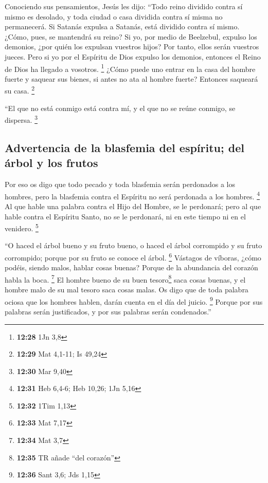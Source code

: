 \begin{paracol}{2}
 Conociendo sus pensamientos, Jesús les dijo: ``Todo
reino dividido contra sí mismo es desolado, y toda ciudad o casa
dividida contra sí misma no permanecerá.  Si Satanás
expulsa a Satanás, está dividido contra sí mismo. ¿Cómo, pues, se
mantendrá su reino?  Si yo, por medio de Beelzebul,
expulso los demonios, ¿por quién los expulsan vuestros hijos? Por tanto,
ellos serán vuestros jueces.  Pero si yo por el Espíritu
de Dios expulso los demonios, entonces el Reino de Dios ha llegado a
vosotros. \footnote{\textbf{12:28} 1Jn 3,8}  ¿Cómo puede
uno entrar en la casa del hombre fuerte y saquear sus bienes, si antes
no ata al hombre fuerte? Entonces saqueará su casa. \footnote{\textbf{12:29}
  Mat 4,1-11; Is 49,24}

 ``El que no está conmigo está contra mí, y el que no se
reúne conmigo, se dispersa. \footnote{\textbf{12:30} Mar 9,40}

\hypertarget{advertencia-de-la-blasfemia-del-espuxedritu-del-uxe1rbol-y-los-frutos}{%
\subsection{Advertencia de la blasfemia del espíritu; del árbol y los
frutos}\label{advertencia-de-la-blasfemia-del-espuxedritu-del-uxe1rbol-y-los-frutos}}

 Por eso os digo que todo pecado y toda blasfemia serán
perdonados a los hombres, pero la blasfemia contra el Espíritu no será
perdonada a los hombres. \footnote{\textbf{12:31} Heb 6,4-6; Heb 10,26;
  1Jn 5,16}  Al que hable una palabra contra el Hijo del
Hombre, se le perdonará; pero al que hable contra el Espíritu Santo, no
se le perdonará, ni en este tiempo ni en el venidero. \footnote{\textbf{12:32}
  1Tim 1,13}

 ``O haced el árbol bueno y su fruto bueno, o haced el
árbol corrompido y su fruto corrompido; porque por su fruto se conoce el
árbol. \footnote{\textbf{12:33} Mat 7,17}  Vástagos de
víboras, ¿cómo podéis, siendo malos, hablar cosas buenas? Porque de la
abundancia del corazón habla la boca. \footnote{\textbf{12:34} Mat 3,7}
 El hombre bueno de su buen tesoro\footnote{\textbf{12:35}
  TR añade ``del corazón''} saca cosas buenas, y el hombre malo de su
mal tesoro saca cosas malas.  Os digo que de toda palabra
ociosa que los hombres hablen, darán cuenta en el día del juicio.
\footnote{\textbf{12:36} Sant 3,6; Jds 1,15}  Porque por
sus palabras serán justificados, y por sus palabras serán condenados.''


\end{paracol}
